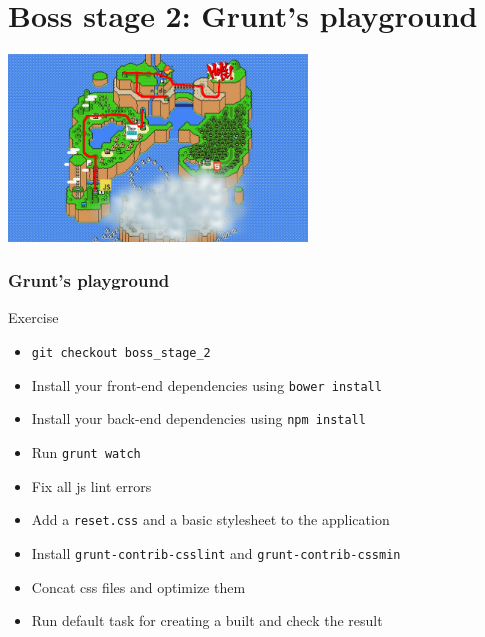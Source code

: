 \section{Boss stage 2: Grunt's playground}

\begin{frame}[fragile]
  \begin{center}
    \includegraphics[width=300px]{images/map_boss_stage_2.png}
  \end{center}
\end{frame}

\begin{frame}[fragile]
  \frametitle{Grunt's playground}
  \begin{block}{Exercise}
    \begin{itemize}
      \item \texttt{git checkout boss\_stage\_2}
      \item Install your front-end dependencies using \texttt{bower install}
      \item Install your back-end dependencies using \texttt{npm install}
      \item Run \texttt{grunt watch}
      \item Fix all js lint errors
      \item Add a \texttt{reset.css} and a basic stylesheet to the application
      \item Install \texttt{grunt-contrib-csslint} and \texttt{grunt-contrib-cssmin}
      \item Concat css files and optimize them
      \item Run default task for creating a built and check the result
    \end{itemize}
  \end{block}
\end{frame}
